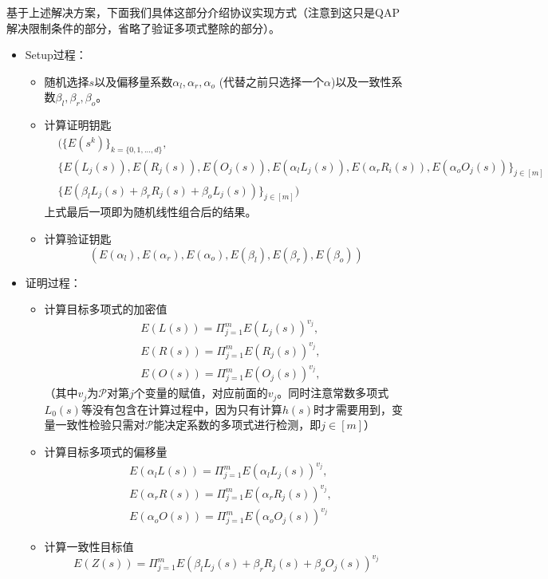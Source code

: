 \documentclass[12pt]{article}
\newcommand{\pp}{$\mathcal{P}$}
\begin{document}
基于上述解决方案，下面我们具体这部分介绍协议实现方式（注意到这只是QAP解决限制条件的部分，省略了验证多项式整除的部分）。
\begin{itemize}
	\item Setup过程：
	\begin{itemize}
	   \item  随机选择$s$以及偏移量系数$\alpha_l,\alpha_r,\alpha_o$ (代替之前只选择一个$\alpha$)以及一致性系数$\beta_l,\beta_r,\beta_o$。
	   \item 计算证明钥匙	   
	   \begin{align*}
	    &\big( \{E(s^k)\}_{k=\{0,1,...,d\}}, \\
	    & \{E(L_j(s)),E(R_j(s)),E(O_j(s)),E(\alpha_l L_j(s)), E(\alpha_r R_i(s)),E(\alpha_o O_j(s))\}_{j \in [m]}\\
	    & \{ E(\beta_l L_j(s)+\beta_r R_j(s)+\beta_o L_j(s))\}_{j \in [m]} \big)
	   \end{align*}
	   上式最后一项即为随机线性组合后的结果。   
	   	   \item 计算验证钥匙	 
	   	   $$(E(\alpha_l),E(\alpha_r),E(\alpha_o),E(\beta_l),E(\beta_r),E(\beta_o))$$
	 \end{itemize}
     \item 证明过程：
     \begin{itemize}
     	\item 计算目标多项式的加密值
     	  \begin{align*}
     	  &E(L(s))= \Pi_{j=1}^m E(L_j(s))^{v_j},\\
     	&  E(R(s))= \Pi_{j=1}^m E(R_j(s))^{v_j},\\
     	&  E(O(s))= \Pi_{j=1}^m E(O_j(s))^{v_j},
     	  \end{align*}
     	  （其中$v_j$为\pp 对第$j$个变量的赋值，对应前面的$v_j$。同时注意常数多项式$L_0(s)$等没有包含在计算过程中，因为只有计算$h(s)$时才需要用到，变量一致性检验只需对\pp 能决定系数的多项式进行检测，即$j \in [m]$）
     	\item 计算目标多项式的偏移量
     	     	  \begin{align*}
     	&E(\alpha_l L(s))= \Pi_{j=1}^m E(\alpha_l L_j(s))^{v_j},\\
     	&E(\alpha_r R(s))= \Pi_{j=1}^m E(\alpha_r R_j(s))^{v_j},\\
     	&E(\alpha_o O(s))= \Pi_{j=1}^m E(\alpha_o O_j(s))^{v_j}
     	     	  \end{align*}
     	 \item 计算一致性目标值
     	 $$E(Z(s))=\Pi_{j=1}^m E(\beta_l L_j(s)+\beta_r R_j(s)+\beta_o O_j(s))^{v_j}$$

\end{itemize}
\end{itemize}
\end{document}
